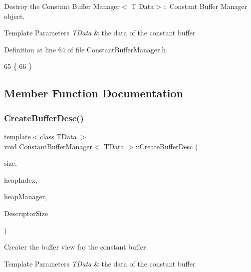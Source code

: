 Destroy the Constant Buffer Manager$<$ T Data$>$\+:\+: Constant Buffer Manager object. 


\begin{DoxyTemplParams}{Template Parameters}
{\em T\+Data} & the data of the constant buffer \\
\hline
\end{DoxyTemplParams}


Definition at line 64 of file Constant\+Buffer\+Manager.\+h.


\begin{DoxyCode}
65 \{
66 \}
\end{DoxyCode}


\subsection{Member Function Documentation}
\mbox{\label{class_constant_buffer_manager_ae2b99485f70df0dd8056164be91cc368}} 
\subsubsection{\texorpdfstring{Create\+Buffer\+Desc()}{CreateBufferDesc()}}
{\footnotesize\ttfamily template$<$class T\+Data $>$ \\
void \mbox{\hyperlink{class_constant_buffer_manager}{Constant\+Buffer\+Manager}}$<$ T\+Data $>$\+::Create\+Buffer\+Desc (\begin{DoxyParamCaption}\item[{const U\+I\+NT}]{size,  }\item[{U\+I\+NT}]{heap\+Index,  }\item[{std\+::shared\+\_\+ptr$<$ \mbox{\hyperlink{class_descriptor_heap_manager}{Descriptor\+Heap\+Manager}} $>$}]{heap\+Manager,  }\item[{U\+I\+NT}]{Descriptor\+Size }\end{DoxyParamCaption})}



Creater the buffer view for the constant buffer. 


\begin{DoxyTemplParams}{Template Parameters}
{\em T\+Data} & the data of the constant buffer \\
\hline
\end{DoxyTemplParams}

